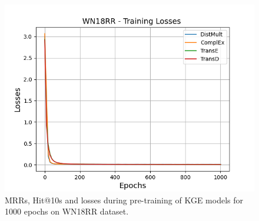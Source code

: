 \begin{figure}[H]
\begin{minipage}{.3\textwidth}
      \includegraphics[width=\linewidth]{figures/results/pretrain/wn18rr/pretrain_wn18rr_losses.png}
    \end{minipage}%
    \caption{MRRs, Hit@10s and losses during pre-training of \ac{KGE} models for 1000 epochs on \textsc{WN18RR} dataset.}
    \label{fig:pretraining}
\end{figure}
